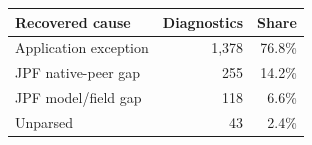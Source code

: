   \renewcommand{\theHreporttablerow}{rq6_jpf_exception_causes.\arabic{reporttablerow}}
  \setcounter{reporttablerow}{0}
  \begin{tabular}{lrr}
  \toprule
  Recovered cause & Diagnostics & Share \\
  \midrule
  {reporttablerow}\label{tabrow:rq6_jpf_exception_causes:Application@20exception}Application exception & 1,378 & 76.8\% \\
  {reporttablerow}\label{tabrow:rq6_jpf_exception_causes:JPF@20native-peer@20gap}JPF native-peer gap & 255 & 14.2\% \\
  {reporttablerow}\label{tabrow:rq6_jpf_exception_causes:JPF@20model@2Ffield@20gap}JPF model/field gap & 118 & 6.6\% \\
  {reporttablerow}\label{tabrow:rq6_jpf_exception_causes:Unparsed}Unparsed & 43 & 2.4\% \\
  \bottomrule
  \end{tabular}
